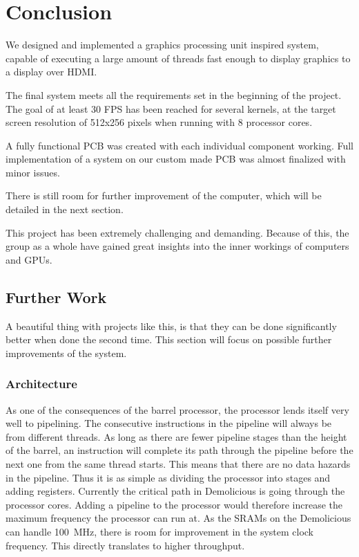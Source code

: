 \documentclass[../main/report.tex]{subfiles}
\begin{document}
\chapter{Conclusion}

We designed and implemented a graphics processing unit inspired system,
capable of executing a large amount of threads fast enough to display graphics to a display over HDMI.

The final system meets all the requirements set in the beginning of the project.
The goal of at least 30 FPS has been reached for several kernels,
at the target screen resolution of 512x256 pixels when running with 8 processor cores.

A fully functional PCB was created with each individual component working.
Full implementation of a system on our custom made PCB was almost finalized with minor issues.

There is still room for further improvement of the computer, which will be detailed in the next section.

This project has been extremely challenging and demanding.
Because of this, the group as a whole have gained great insights into the inner workings of computers and GPUs.

\section{Further Work}

A beautiful thing with projects like this, is that they can be done significantly better when done the second time.
This section will focus on possible further improvements of the system.

\subsection{Architecture}

As one of the consequences of the barrel processor, the processor lends itself very well to pipelining.
The consecutive instructions in the pipeline will always be from different threads.
As long as there are fewer pipeline stages than the height of the barrel, an instruction will complete its path through the pipeline before the next one from the same thread starts.
This means that there are no data hazards in the pipeline. Thus it is as simple as dividing the processor into stages and adding registers.
Currently the critical path in Demolicious is going through the processor cores.
Adding a pipeline to the processor would therefore increase the maximum frequency the processor can run at.
As the SRAMs on the Demolicious can handle \SI{100}{MHz}, there is room for improvement in the system clock frequency.
This directly translates to higher throughput.
\end{document}
